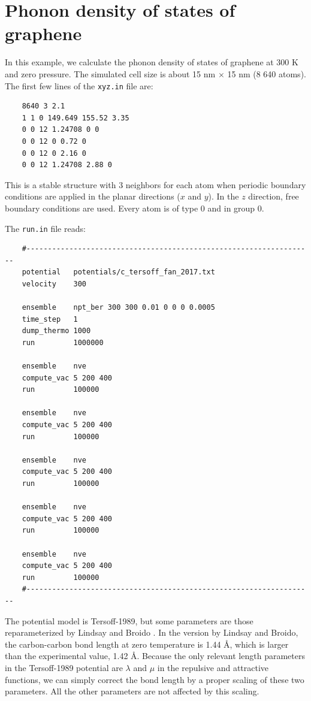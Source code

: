 \documentclass[12pt,a4paper]{report}
\begin{document}
\section{Phonon density of states of graphene}


In this example, we calculate the phonon density of states of graphene at 300 K
and zero pressure. The simulated cell size is about 15 nm $\times$ 15 nm (8 640 atoms).
The first few lines of the \verb"xyz.in" file are:
\begin{verbatim}
    8640 3 2.1
    1 1 0 149.649 155.52 3.35
    0 0 12 1.24708 0 0
    0 0 12 0 0.72 0
    0 0 12 0 2.16 0
    0 0 12 1.24708 2.88 0
\end{verbatim}
This is a stable structure with 3 neighbors for each atom when periodic boundary conditions are applied in the planar directions ($x$ and $y$). In the $z$ direction, free boundary conditions are used. Every atom is of type 0 and in group 0.

The \verb"run.in" file reads:
\begin{verbatim}
    #-------------------------------------------------------------------
    potential   potentials/c_tersoff_fan_2017.txt
    velocity    300

    ensemble    npt_ber 300 300 0.01 0 0 0 0.0005
    time_step   1
    dump_thermo 1000
    run         1000000

    ensemble    nve
    compute_vac 5 200 400
    run         100000

    ensemble    nve
    compute_vac 5 200 400
    run         100000

    ensemble    nve
    compute_vac 5 200 400
    run         100000

    ensemble    nve
    compute_vac 5 200 400
    run         100000

    ensemble    nve
    compute_vac 5 200 400
    run         100000
    #-------------------------------------------------------------------
\end{verbatim}

The potential model is Tersoff-1989, but some parameters are those reparameterized by Lindsay and Broido \cite{lindsay2010prb}. In the version by Lindsay and Broido, the carbon-carbon bond length at zero temperature is 1.44 \AA, which is larger than the experimental value, 1.42 \AA. Because the only relevant length parameters in the Tersoff-1989 potential are $\lambda$ and $\mu$ in the repulsive and attractive functions, we can simply correct the bond length by a proper scaling of these two parameters. All the other parameters are not affected by this scaling.
\end{document}
